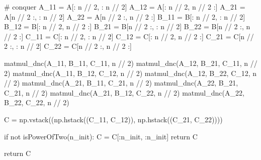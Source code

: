 \documentclass[
  letterpaper,
  DIV=11,
  numbers=noendperiod]{scrartcl}
\newenvironment{Shaded}{\begin{snugshade}}{\end{snugshade}}
\newcommand{\CommentTok}[1]{\textcolor[rgb]{0.37,0.37,0.37}{#1}}
\newcommand{\ControlFlowTok}[1]{\textcolor[rgb]{0.00,0.23,0.31}{#1}}
\newcommand{\DecValTok}[1]{\textcolor[rgb]{0.68,0.00,0.00}{#1}}
\newcommand{\KeywordTok}[1]{\textcolor[rgb]{0.00,0.23,0.31}{#1}}
\newcommand{\NormalTok}[1]{\textcolor[rgb]{0.00,0.23,0.31}{#1}}
\newcommand{\OperatorTok}[1]{\textcolor[rgb]{0.37,0.37,0.37}{#1}}
\begin{document}
\begin{Shaded}
\begin{Highlighting}[]
    \CommentTok{\# conquer}
\NormalTok{    A\_11 }\OperatorTok{=}\NormalTok{ A[: n }\OperatorTok{//} \DecValTok{2}\NormalTok{, : n }\OperatorTok{//} \DecValTok{2}\NormalTok{]}
\NormalTok{    A\_12 }\OperatorTok{=}\NormalTok{ A[: n }\OperatorTok{//} \DecValTok{2}\NormalTok{, n }\OperatorTok{//} \DecValTok{2}\NormalTok{ :]}
\NormalTok{    A\_21 }\OperatorTok{=}\NormalTok{ A[n }\OperatorTok{//} \DecValTok{2}\NormalTok{ :, : n }\OperatorTok{//} \DecValTok{2}\NormalTok{]}
\NormalTok{    A\_22 }\OperatorTok{=}\NormalTok{ A[n }\OperatorTok{//} \DecValTok{2}\NormalTok{ :, n }\OperatorTok{//} \DecValTok{2}\NormalTok{ :]}
\NormalTok{    B\_11 }\OperatorTok{=}\NormalTok{ B[: n }\OperatorTok{//} \DecValTok{2}\NormalTok{, : n }\OperatorTok{//} \DecValTok{2}\NormalTok{]}
\NormalTok{    B\_12 }\OperatorTok{=}\NormalTok{ B[: n }\OperatorTok{//} \DecValTok{2}\NormalTok{, n }\OperatorTok{//} \DecValTok{2}\NormalTok{ :]}
\NormalTok{    B\_21 }\OperatorTok{=}\NormalTok{ B[n }\OperatorTok{//} \DecValTok{2}\NormalTok{ :, : n }\OperatorTok{//} \DecValTok{2}\NormalTok{]}
\NormalTok{    B\_22 }\OperatorTok{=}\NormalTok{ B[n }\OperatorTok{//} \DecValTok{2}\NormalTok{ :, n }\OperatorTok{//} \DecValTok{2}\NormalTok{ :]}
\NormalTok{    C\_11 }\OperatorTok{=}\NormalTok{ C[: n }\OperatorTok{//} \DecValTok{2}\NormalTok{, : n }\OperatorTok{//} \DecValTok{2}\NormalTok{]}
\NormalTok{    C\_12 }\OperatorTok{=}\NormalTok{ C[: n }\OperatorTok{//} \DecValTok{2}\NormalTok{, n }\OperatorTok{//} \DecValTok{2}\NormalTok{ :]}
\NormalTok{    C\_21 }\OperatorTok{=}\NormalTok{ C[n }\OperatorTok{//} \DecValTok{2}\NormalTok{ :, : n }\OperatorTok{//} \DecValTok{2}\NormalTok{]}
\NormalTok{    C\_22 }\OperatorTok{=}\NormalTok{ C[n }\OperatorTok{//} \DecValTok{2}\NormalTok{ :, n }\OperatorTok{//} \DecValTok{2}\NormalTok{ :]}

\NormalTok{    matmul\_dnc(A\_11, B\_11, C\_11, n }\OperatorTok{//} \DecValTok{2}\NormalTok{)}
\NormalTok{    matmul\_dnc(A\_12, B\_21, C\_11, n }\OperatorTok{//} \DecValTok{2}\NormalTok{)}
\NormalTok{    matmul\_dnc(A\_11, B\_12, C\_12, n }\OperatorTok{//} \DecValTok{2}\NormalTok{)}
\NormalTok{    matmul\_dnc(A\_12, B\_22, C\_12, n }\OperatorTok{//} \DecValTok{2}\NormalTok{)}
\NormalTok{    matmul\_dnc(A\_21, B\_11, C\_21, n }\OperatorTok{//} \DecValTok{2}\NormalTok{)}
\NormalTok{    matmul\_dnc(A\_22, B\_21, C\_21, n }\OperatorTok{//} \DecValTok{2}\NormalTok{)}
\NormalTok{    matmul\_dnc(A\_21, B\_12, C\_22, n }\OperatorTok{//} \DecValTok{2}\NormalTok{)}
\NormalTok{    matmul\_dnc(A\_22, B\_22, C\_22, n }\OperatorTok{//} \DecValTok{2}\NormalTok{)}

\NormalTok{    C }\OperatorTok{=}\NormalTok{ np.vstack((np.hstack((C\_11, C\_12)), np.hstack((C\_21, C\_22))))}

    \ControlFlowTok{if} \KeywordTok{not}\NormalTok{ isPowerOfTwo(n\_init):}
\NormalTok{        C }\OperatorTok{=}\NormalTok{ C[:n\_init, :n\_init]}
        \ControlFlowTok{return}\NormalTok{ C}

    \ControlFlowTok{return}\NormalTok{ C}
\end{Highlighting}
\end{Shaded}
\end{document}
